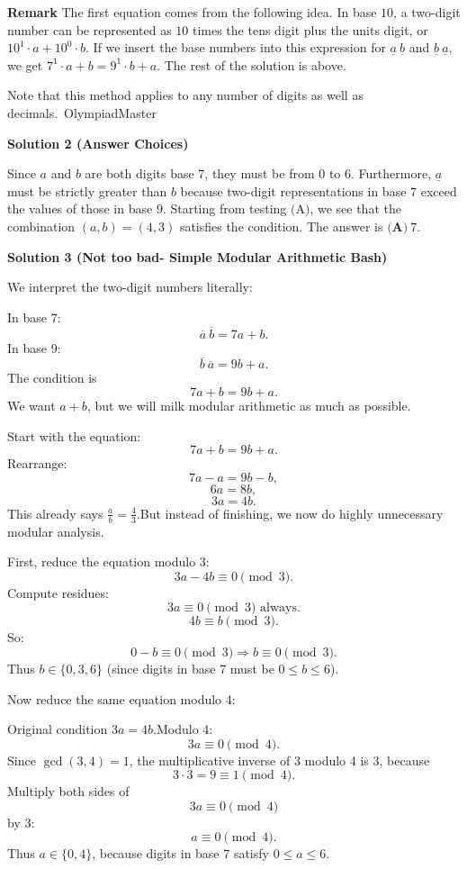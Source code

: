 \begin{enumerate}
 \textbf{Remark} The first equation comes from the following idea. In base $10$, a two-digit number can be represented as $10$ times the tens digit plus the units digit, or $10^1 \cdot a + 10^0 \cdot b$. If we insert the base numbers into this expression for $\underline{a}~\underline{b}$ and $\underline{b}~\underline{a}$, we get $7^1 \cdot a + b = 9^1 \cdot b + a$. The rest of the solution is above.

 Note that this method applies to any number of digits as well as decimals.~OlympiadMaster

 



\textbf{Solution 2 (Answer Choices)}

Since $a$ and $b$ are both digits base $7$, they must be from $0$ to $6$. Furthermore, $\underline{a}$ must be strictly greater than $b$ because two-digit representations in base $7$ exceed the values of those in base $9$. Starting from testing $\text{(A)}$, we see that the combination $(a, b) = (4, 3)$ satisfies the condition. The answer is $\boxed{\textbf{(A)}~7}$.

 



\textbf{Solution 3 (Not too bad- Simple Modular Arithmetic Bash)}

We interpret the two-digit numbers literally:

 In base 7:
 \[\overline{a} \ \overline{b} = 7a + b.\]In base 9:
 \[\overline{b} \ \overline{a} = 9b + a.\]The condition is
 \[7a + b = 9b + a.\]We want \( a + b \), but we will milk modular arithmetic as much as possible.

 Start with the equation:
 \[7a + b = 9b + a.\]Rearrange:
 \[7a - a = 9b - b,\]
 \[6a = 8b,\]
 \[3a = 4b.\]This already says \( \frac{a}{b} = \frac{4}{3} \).But instead of finishing, we now do highly unnecessary modular analysis.

 First, reduce the equation modulo 3:
 \[3a - 4b \equiv 0 \pmod{3}.\]Compute residues:
 \[3a \equiv 0 \pmod{3} \text{ always.}\]
 \[4b \equiv b \pmod{3}.\]So:
 \[0 - b \equiv 0 \pmod{3} \Rightarrow b \equiv 0 \pmod{3}.\]Thus \( b \in \{0, 3, 6\} \) (since digits in base 7 must be \( 0 \le b \le 6 \)).

 Now reduce the same equation modulo 4:

 Original condition \( 3a = 4b \).Modulo 4:
 \[3a \equiv 0 \pmod{4}.\]Since \( \gcd(3, 4) = 1 \), the multiplicative inverse of 3 modulo 4 is 3, because
 \[3 \cdot 3 = 9 \equiv 1 \pmod{4}.\]Multiply both sides of
 \[3a \equiv 0 \pmod{4}\]by 3:
 \[a \equiv 0 \pmod{4}.\]Thus \( a \in \{0, 4\} \), because digits in base 7 satisfy \( 0 \le a \le 6 \).


\end{enumerate}
